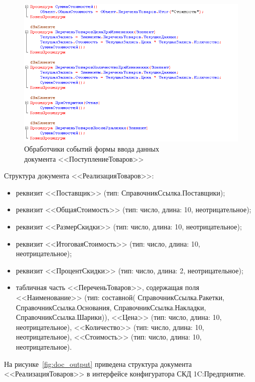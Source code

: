 \begin{figure}[h!]
  \centering
  \includegraphics[width=130mm]{pic/doc_input_module}
  \caption{Обработчики событий формы ввода данных \\
    документа <<ПоступлениеТоваров>>}
  \label{fig:doc_input_module}
\end{figure}

Структура документа <<РеализацияТоваров>>:
\begin{itemize}
\item реквизит <<Поставщик>> (тип: СправочникСсылка.Поставщики);
\item реквизит <<ОбщаяСтоимость>> (тип: число, длина: 10, неотрицательное);
\item реквизит <<РазмерСкидки>> (тип: число, длина: 10, неотрицательное);
\item реквизит <<ИтоговаяСтоимость>> (тип: число, длина: 10, неотрицательное);
\item реквизит <<ПроцентСкидки>> (тип: число, длина: 2, неотрицательное);
\item табличная часть <<ПереченьТоваров>>, содержащая поля
  <<Наименование>> (тип: составной(%
  СправочникСсылка.Ракетки,
  СправочникСсылка.Основания,
  СправочникСсылка.Накладки,
  СправочникСсылка.Шарики)),
  <<Цена>> (тип: число, длина: 10, неотрицательное),
  <<Количество>> (тип: число, длина: 10, неотрицательное),
  <<Стоимость>> (тип: число, длина: 10, неотрицательное).
\end{itemize}

На рисунке~\ref{fig:doc_output} приведена
структура документа <<РеализацияТоваров>> в интерфейсе конфигуратора
СКД 1C:Предприятие.

